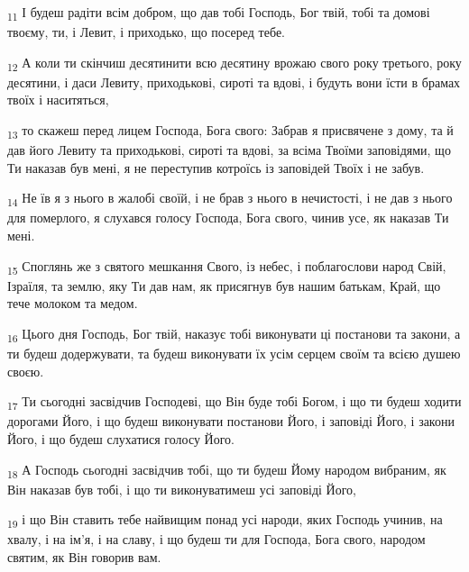 \begin{tcolorbox}
\textsubscript{11} І будеш радіти всім добром, що дав тобі Господь, Бог твій, тобі та домові твоєму, ти, і Левит, і приходько, що посеред тебе.
\end{tcolorbox}
\begin{tcolorbox}
\textsubscript{12} А коли ти скінчиш десятинити всю десятину врожаю свого року третього, року десятини, і даси Левиту, приходькові, сироті та вдові, і будуть вони їсти в брамах твоїх і наситяться,
\end{tcolorbox}
\begin{tcolorbox}
\textsubscript{13} то скажеш перед лицем Господа, Бога свого: Забрав я присвячене з дому, та й дав його Левиту та приходькові, сироті та вдові, за всіма Твоїми заповідями, що Ти наказав був мені, я не переступив котроїсь із заповідей Твоїх і не забув.
\end{tcolorbox}
\begin{tcolorbox}
\textsubscript{14} Не їв я з нього в жалобі своїй, і не брав з нього в нечистості, і не дав з нього для померлого, я слухався голосу Господа, Бога свого, чинив усе, як наказав Ти мені.
\end{tcolorbox}
\begin{tcolorbox}
\textsubscript{15} Споглянь же з святого мешкання Свого, із небес, і поблагослови народ Свій, Ізраїля, та землю, яку Ти дав нам, як присягнув був нашим батькам, Край, що тече молоком та медом.
\end{tcolorbox}
\begin{tcolorbox}
\textsubscript{16} Цього дня Господь, Бог твій, наказує тобі виконувати ці постанови та закони, а ти будеш додержувати, та будеш виконувати їх усім серцем своїм та всією душею своєю.
\end{tcolorbox}
\begin{tcolorbox}
\textsubscript{17} Ти сьогодні засвідчив Господеві, що Він буде тобі Богом, і що ти будеш ходити дорогами Його, і що будеш виконувати постанови Його, і заповіді Його, і закони Його, і що будеш слухатися голосу Його.
\end{tcolorbox}
\begin{tcolorbox}
\textsubscript{18} А Господь сьогодні засвідчив тобі, що ти будеш Йому народом вибраним, як Він наказав був тобі, і що ти виконуватимеш усі заповіді Його,
\end{tcolorbox}
\begin{tcolorbox}
\textsubscript{19} і що Він ставить тебе найвищим понад усі народи, яких Господь учинив, на хвалу, і на ім'я, і на славу, і що будеш ти для Господа, Бога свого, народом святим, як Він говорив вам.
\end{tcolorbox}
